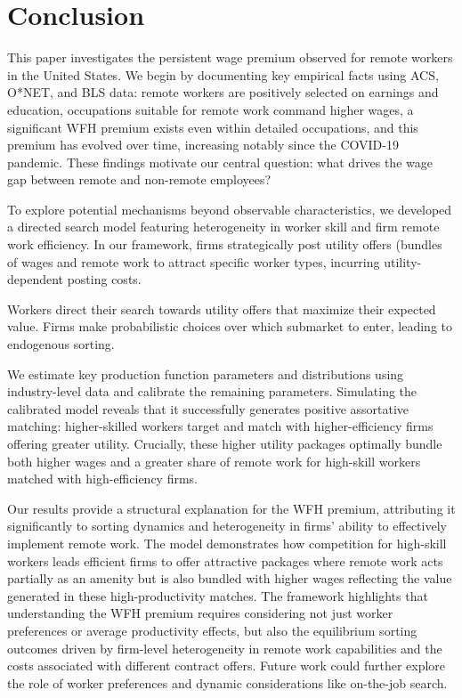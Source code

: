 \documentclass[
  11pt,
  letterpaper,
  DIV=11,
  numbers=noendperiod]{scrartcl}
\theoremstyle{plain}
\theoremstyle{remark}
\begin{document}
\section{Conclusion}\label{conclusion}

This paper investigates the persistent wage premium observed for remote
workers in the United States. We begin by documenting key empirical
facts using ACS, O*NET, and BLS data: remote workers are positively
selected on earnings and education, occupations suitable for remote work
command higher wages, a significant WFH premium exists even within
detailed occupations, and this premium has evolved over time, increasing
notably since the COVID-19 pandemic. These findings motivate our central
question: what drives the wage gap between remote and non-remote
employees?

To explore potential mechanisms beyond observable characteristics, we
developed a directed search model featuring heterogeneity in worker
skill and firm remote work efficiency. In our framework, firms
strategically post utility offers (bundles of wages and remote work to
attract specific worker types, incurring utility-dependent posting
costs.

Workers direct their search towards utility offers that maximize their
expected value. Firms make probabilistic choices over which submarket to
enter, leading to endogenous sorting.

We estimate key production function parameters and distributions using
industry-level data and calibrate the remaining parameters. Simulating
the calibrated model reveals that it successfully generates positive
assortative matching: higher-skilled workers target and match with
higher-efficiency firms offering greater utility. Crucially, these
higher utility packages optimally bundle both higher wages and a greater
share of remote work for high-skill workers matched with high-efficiency
firms.

Our results provide a structural explanation for the WFH premium,
attributing it significantly to sorting dynamics and heterogeneity in
firms' ability to effectively implement remote work. The model
demonstrates how competition for high-skill workers leads efficient
firms to offer attractive packages where remote work acts partially as
an amenity but is also bundled with higher wages reflecting the value
generated in these high-productivity matches. The framework highlights
that understanding the WFH premium requires considering not just worker
preferences or average productivity effects, but also the equilibrium
sorting outcomes driven by firm-level heterogeneity in remote work
capabilities and the costs associated with different contract offers.
Future work could further explore the role of worker preferences and
dynamic considerations like on-the-job search.
\end{document}
